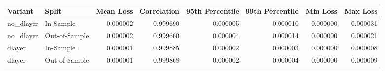 \begin{tabular}{llrrrrrr}
\toprule
Variant & Split & Mean Loss & Correlation & 95th Percentile & 99th Percentile & Min Loss & Max Loss \\
\midrule
no_dlayer & In-Sample & 0.000002 & 0.999690 & 0.000005 & 0.000010 & 0.000000 & 0.000031 \\
no_dlayer & Out-of-Sample & 0.000002 & 0.999660 & 0.000004 & 0.000014 & 0.000000 & 0.000021 \\
dlayer & In-Sample & 0.000001 & 0.999885 & 0.000002 & 0.000003 & 0.000000 & 0.000008 \\
dlayer & Out-of-Sample & 0.000001 & 0.999868 & 0.000002 & 0.000004 & 0.000000 & 0.000009 \\
\bottomrule
\end{tabular}
